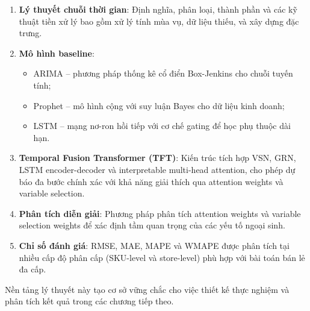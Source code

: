 \begin{enumerate}
    \item \textbf{Lý thuyết chuỗi thời gian}: Định nghĩa, phân loại, thành phần và các kỹ thuật tiền xử lý bao gồm xử lý tính mùa vụ, dữ liệu thiếu, và xây dựng đặc trưng.

    \item \textbf{Mô hình baseline}:
    \begin{itemize}
        \item ARIMA -- phương pháp thống kê cổ điển Box-Jenkins cho chuỗi tuyến tính;
        \item Prophet -- mô hình cộng với suy luận Bayes cho dữ liệu kinh doanh;
        \item LSTM -- mạng nơ-ron hồi tiếp với cơ chế gating để học phụ thuộc dài hạn.
    \end{itemize}

    \item \textbf{Temporal Fusion Transformer (TFT)}: Kiến trúc tích hợp VSN, GRN, LSTM encoder-decoder và interpretable multi-head attention, cho phép dự báo đa bước chính xác với khả năng giải thích qua attention weights và variable selection.

    \item \textbf{Phân tích diễn giải}: Phương pháp phân tích attention weights và variable selection weights để xác định tầm quan trọng của các yếu tố ngoại sinh.

    \item \textbf{Chỉ số đánh giá}: RMSE, MAE, MAPE và WMAPE được phân tích tại nhiều cấp độ phân cấp (SKU-level và store-level) phù hợp với bài toán bán lẻ đa cấp.
\end{enumerate}

Nền tảng lý thuyết này tạo cơ sở vững chắc cho việc thiết kế thực nghiệm và phân tích kết quả trong các chương tiếp theo.
